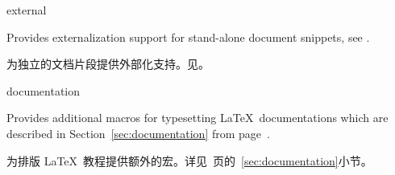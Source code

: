 





\begin{docTcbKey}[library]{external}{}{}

Provides externalization support for stand-alone document snippets,
see .

为独立的文档片段提供外部化支持。见。

\end{docTcbKey}
















\begin{docTcbKey}[library]{documentation}{}{}

Provides additional macros for typesetting \LaTeX\ documentations
which are described in Section~\ref{sec:documentation}
from page~\pageref{sec:documentation}. 

为排版 \LaTeX\ 教程提供额外的宏。详见~\pageref{sec:documentation}页的~\ref{sec:documentation}小节。

\end{docTcbKey}

